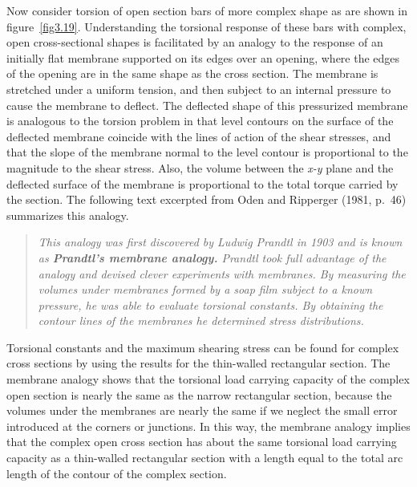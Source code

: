 \documentclass{AeroStructure-ERJohnson}
\begin{document}
\vspace*{-1pc}


Now consider torsion of open section bars of more complex shape as are shown in figure~\ref{fig3.19}. Understanding the torsional response of these bars with complex, open cross-sectional shapes is facilitated by an analogy to\vadjust{\pagebreak} the response of an initially flat membrane supported on its edges over an opening, where the edges of the opening are in the same shape as the cross section. The membrane is stretched under a uniform tension, and then subject to an internal pressure to cause the membrane to deflect. The deflected shape of this pressurized membrane is analogous to the torsion problem in that level contours on the surface of the deflected membrane coincide with the lines of action of the shear stresses, and that the slope of the membrane normal to the level contour is proportional to the magnitude to the shear stress. Also, the volume between the \textit{x-y} plane and the deflected surface of the membrane is proportional to the total torque carried by the section. The following text excerpted from Oden and Ripperger (1981, p.~46) summarizes this analogy.


{\def\thefigure{3.19}
}

\begin{quote}
\textit{This analogy was first discovered by Ludwig Prandtl in 1903 and is known as \textbf{Prandtl's membrane analogy.} Prandtl took full advantage of the analogy and devised clever experiments with membranes. By measuring the volumes under membranes formed by a soap film subject to a known pressure, he was able to evaluate torsional constants. By obtaining the contour lines of the membranes he determined stress distributions.}%
\end{quote}
\noindent Torsional constants and the maximum shearing stress can be found for complex cross sections by using the results for the thin-walled rectangular section. The membrane analogy shows that the torsional load carrying capacity of the complex open section is nearly the same as the narrow rectangular section, because the volumes under the membranes are nearly the same if we neglect the small error introduced at the corners or junctions. In this way, the membrane analogy implies that the complex open cross section has about the same torsional load carrying capacity as a thin-walled rectangular section with a length equal to the total arc length of the contour of the complex section.
\end{document}

